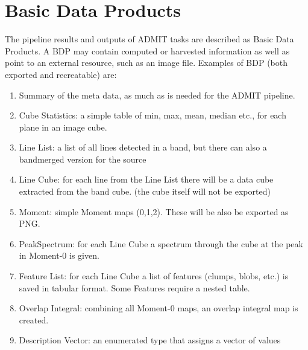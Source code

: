 \documentclass{article}
\begin{document}
%
%
%
%
%
%
%
%

\section{Basic Data Products}

The pipeline results and outputs of ADMIT tasks are described as 
Basic Data Products. A BDP may contain computed or harvested information
as well as point to an external resource, such as an image file.
%
Examples of BDP (both exported and recreatable) are:


\begin{enumerate}
\item
Summary of the meta data, as much as is needed for the ADMIT pipeline. 
\item
Cube Statistics: a simple table of min, max, mean, median etc., for each plane in
an image cube.
\item
Line List: a list of all lines detected in a band, but there can also a 
bandmerged version for the source
\item
Line Cube: for each line from the Line List there will be a data cube extracted from the
band cube.  (the cube itself will not be exported)
\item
Moment: simple Moment maps (0,1,2). These will be also be exported as PNG.
\item
PeakSpectrum: for each Line Cube a spectrum through the cube at the peak in Moment-0 is given.
\item
Feature List: for each Line Cube a list of features (clumps, blobs, etc.) is saved in tabular format.
Some Features require a nested table. 
\item 
Overlap Integral: combining all Moment-0 maps, an overlap integral map is created.
\item
Description Vector: an enumerated type that assigns a vector of values 
\end{enumerate}
\end{document}
